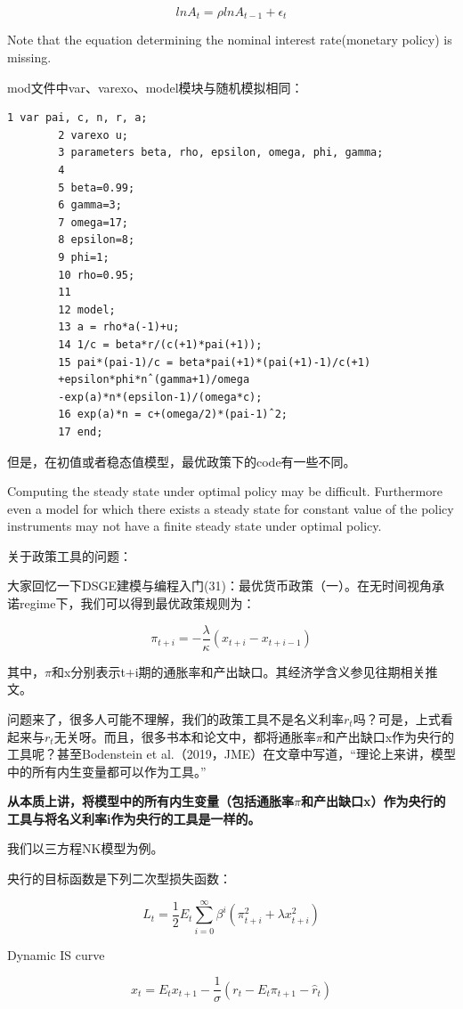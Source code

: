 \documentclass[cn,10pt,math=newtx,citestyle=gb7714-2015,bibstyle=gb7714-2015]{elegantbook}
\begin{document}
	$$lnA_t=\rho lnA_{t-1}+\epsilon_t$$
	
	Note that the equation determining the nominal interest rate(monetary policy) is missing.
	
	mod文件中var、varexo、model模块与随机模拟相同：
	
	\begin{lstlisting}[frame=shadowbox]
		1 var pai, c, n, r, a;
		2 varexo u;
		3 parameters beta, rho, epsilon, omega, phi, gamma;
		4
		5 beta=0.99;
		6 gamma=3;
		7 omega=17;
		8 epsilon=8;
		9 phi=1;
		10 rho=0.95;
		11
		12 model;
		13 a = rho*a(-1)+u;
		14 1/c = beta*r/(c(+1)*pai(+1));
		15 pai*(pai-1)/c = beta*pai(+1)*(pai(+1)-1)/c(+1)
		+epsilon*phi*nˆ(gamma+1)/omega
		-exp(a)*n*(epsilon-1)/(omega*c);
		16 exp(a)*n = c+(omega/2)*(pai-1)ˆ2;
		17 end;
	\end{lstlisting}
	
	但是，在初值或者稳态值模型，最优政策下的code有一些不同。
	
	Computing the steady state under optimal policy may be difficult. Furthermore even a model for which there exists a steady state for constant value of the policy instruments
	may not have a finite steady state under optimal policy.
	
	关于政策工具的问题：
	
	大家回忆一下DSGE建模与编程入门(31)：最优货币政策（一）。在无时间视角承诺regime下，我们可以得到最优政策规则为：
	
	$$\pi_{t+i}=-\frac{\lambda}{\kappa}(x_{t+i}-x_{t+i-1})$$
	
	其中，$\pi$和x分别表示t+i期的通胀率和产出缺口。其经济学含义参见往期相关推文。
	
	问题来了，很多人可能不理解，我们的政策工具不是名义利率$r_t$吗？可是，上式看起来与$r_t$无关呀。而且，很多书本和论文中，都将通胀率$\pi$和产出缺口x作为央行的工具呢？甚至Bodenstein et al.（2019，JME）在文章中写道，“理论上来讲，模型中的所有内生变量都可以作为工具。”
	
	\textbf{从本质上讲，将模型中的所有内生变量（包括通胀率$\pi$和产出缺口x）作为央行的工具与将名义利率i作为央行的工具是一样的。}
	
	我们以三方程NK模型为例。
	
	央行的目标函数是下列二次型损失函数：
	
	$$L_t=\frac{1}{2}E_t \sum_{i=0}^{\infty}\beta^{i}(\pi_{t+i}^2+\lambda x_{t+i}^2)$$
	
	Dynamic IS curve
	
	$$x_t=E_tx_{t+1}-\frac{1}{\sigma}(r_t-E_t\pi_{t+1}-\hat{r}_t)$$
	
\end{document}
